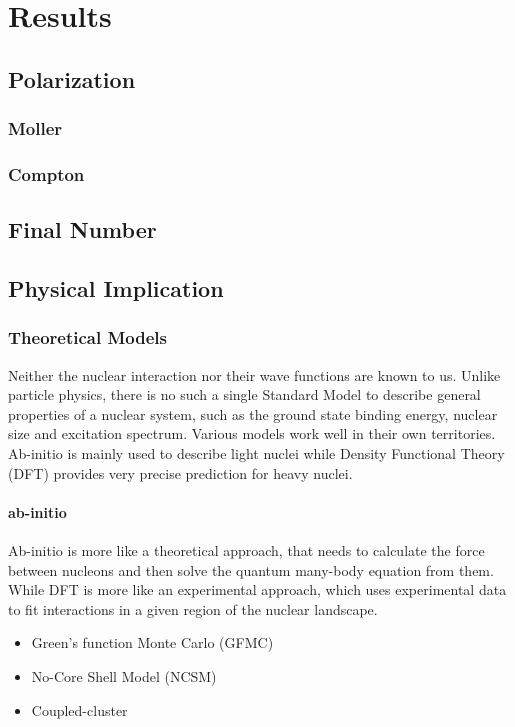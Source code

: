\chapter{Results}

\section{Polarization}
\subsection{Moller}
\subsection{Compton}

\section{Final Number}

\section{Physical Implication}

\subsection{Theoretical Models}
Neither the nuclear interaction nor their wave functions are known to us.
Unlike particle physics, there is no such a single Standard Model to describe
general properties of a nuclear system, such as the ground state binding energy,
nuclear size and excitation spectrum. Various models work well in their own
territories. Ab-initio is mainly used to describe light nuclei while Density
Functional Theory (DFT) provides very precise prediction for heavy nuclei.

\subsubsection{ab-initio}
Ab-initio is more like a theoretical approach, that needs to calculate the force
between nucleons and then solve the quantum many-body equation from them. While
DFT is more like an experimental approach, which uses experimental data to fit
interactions in a given region of the nuclear landscape.
\begin{itemize}
    \item Green's function Monte Carlo (GFMC)
    \item No-Core Shell Model (NCSM)
    \item Coupled-cluster
\end{itemize}
